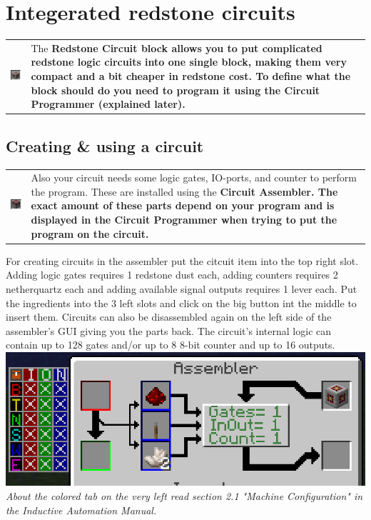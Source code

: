 \documentclass[11pt]{article} %
\makeatletter
\newcommand{\imgtex}{\begin{tabularx}{\textwidth}{@{}c@{ }X@{}}}
\makeatother
\begin{document}
\section{Integerated redstone circuits}
\imgtex
\includegraphics[align = t]{circuit} & The \bf Redstone Circuit \rm block allows you to put complicated redstone logic circuits into one single block, making them very compact and a bit cheaper in redstone cost. To define what the block should do you need to program it using the \bf Circuit Programmer \rm (explained later).\\
\end{tabularx}

\subsection{Creating \& using a circuit}
\imgtex
\includegraphics[align = t]{assembler} & Also your circuit needs some logic gates, IO-ports, and counter to perform the program. These are installed using the \bf Circuit Assembler\rm .
The exact amount of these parts depend on your program and is displayed in the Circuit Programmer when trying to put the program on the circuit.\\
\end{tabularx}

For creating circuits in the assembler put the citcuit item into the top right slot. Adding logic gates requires 1 redstone dust each, adding counters requires 2 netherquartz each and adding available signal outputs requires 1 lever each. Put the ingredients into the 3 left slots and click on the big button int the middle to insert them. Circuits can also be disassembled again on the left side of the assembler's GUI giving you the parts back. The circuit's internal logic can contain up to 128 gates and/or up to 8 8-bit counter and up to 16 outputs.\\
\includegraphics[width = \textwidth]{assembler_gui}\\
\it About the colored tab on the very left read section 2.1 "Machine Configuration" in the Inductive Automation Manual. \rm\\
\end{document}
